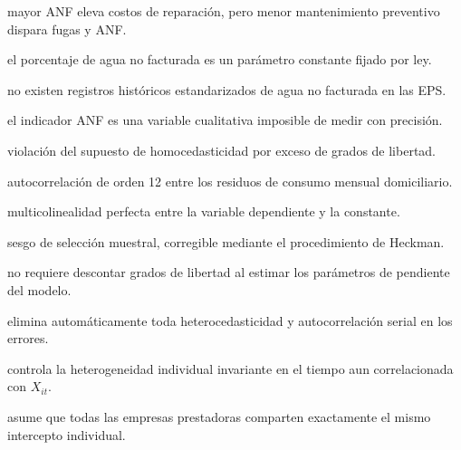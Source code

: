 \begin{opts}
    \item mayor ANF eleva costos de reparación, pero menor mantenimiento preventivo dispara fugas y ANF.
    \item el porcentaje de agua no facturada es un parámetro constante fijado por ley.
    \item no existen registros históricos estandarizados de agua no facturada en las EPS.
    \item el indicador ANF es una variable cualitativa imposible de medir con precisión.
\end{opts}

\begin{opts}
    \item violación del supuesto de homocedasticidad por exceso de grados de libertad.
    \item autocorrelación de orden 12 entre los residuos de consumo mensual domiciliario.
    \item multicolinealidad perfecta entre la variable dependiente y la constante.
    \item sesgo de selección muestral, corregible mediante el procedimiento de Heckman.
\end{opts}

\begin{opts}
    \item no requiere descontar grados de libertad al estimar los parámetros de pendiente del modelo.
    \item elimina automáticamente toda heterocedasticidad y autocorrelación serial en los errores.
    \item controla la heterogeneidad individual invariante en el tiempo aun correlacionada con $X_{it}$.
    \item asume que todas las empresas prestadoras comparten exactamente el mismo intercepto individual.
\end{opts}

